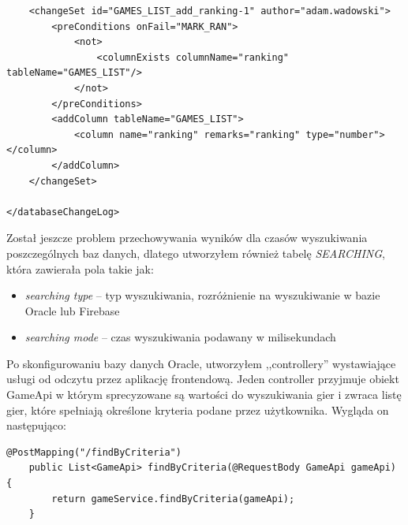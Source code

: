 \begin{lstlisting}
    <changeSet id="GAMES_LIST_add_ranking-1" author="adam.wadowski">
        <preConditions onFail="MARK_RAN">
            <not>
                <columnExists columnName="ranking" tableName="GAMES_LIST"/>
            </not>
        </preConditions>
        <addColumn tableName="GAMES_LIST">
            <column name="ranking" remarks="ranking" type="number"></column>
        </addColumn>
    </changeSet>

</databaseChangeLog>
\end{lstlisting}

Został jeszcze problem przechowywania wyników dla czasów wyszukiwania poszczególnych baz danych, dlatego utworzyłem również tabelę \textit{SEARCHING}, która zawierała pola takie jak:
\begin{itemize}
\item \textit{searching type} -- typ wyszukiwania, rozróżnienie na wyszukiwanie w bazie Oracle lub Firebase
\item \textit{searching mode} -- czas wyszukiwania podawany w milisekundach
\end{itemize}
Po skonfigurowaniu bazy danych Oracle, utworzyłem ,,controllery'' wystawiające usługi od odczytu przez aplikację frontendową. Jeden controller przyjmuje obiekt GameApi w którym sprecyzowane są wartości do wyszukiwania gier i zwraca listę gier, które spełniają określone kryteria podane przez użytkownika. Wygląda on następująco:
\begin{lstlisting}
@PostMapping("/findByCriteria")
    public List<GameApi> findByCriteria(@RequestBody GameApi gameApi) {
        return gameService.findByCriteria(gameApi);
    }
\end{lstlisting}

